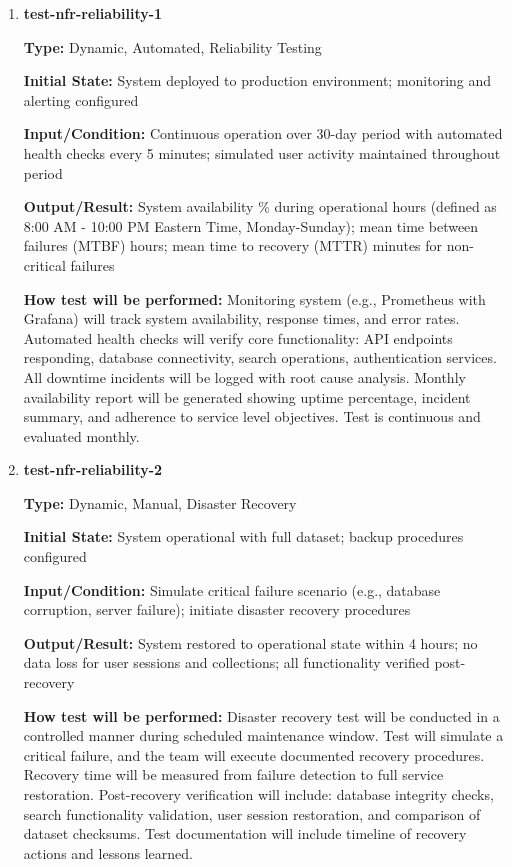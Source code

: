 \documentclass[12pt, titlepage]{article}
\begin{document}
\begin{enumerate}

\item \textbf{test-nfr-reliability-1}

\textbf{Type:} Dynamic, Automated, Reliability Testing
					
\textbf{Initial State:} System deployed to production environment; monitoring and alerting configured
					
\textbf{Input/Condition:} Continuous operation over 30-day period with automated health checks every 5 minutes; simulated user activity maintained throughout period
					
\textbf{Output/Result:} System availability \% during operational hours (defined as 8:00 AM - 10:00 PM Eastern Time, Monday-Sunday); mean time between failures (MTBF)  hours; mean time to recovery (MTTR)  minutes for non-critical failures
					
\textbf{How test will be performed:} Monitoring system (e.g., Prometheus with Grafana) will track system availability, response times, and error rates. Automated health checks will verify core functionality: API endpoints responding, database connectivity, search operations, authentication services. All downtime incidents will be logged with root cause analysis. Monthly availability report will be generated showing uptime percentage, incident summary, and adherence to service level objectives. Test is continuous and evaluated monthly.

\item \textbf{test-nfr-reliability-2}

\textbf{Type:} Dynamic, Manual, Disaster Recovery
					
\textbf{Initial State:} System operational with full dataset; backup procedures configured
					
\textbf{Input/Condition:} Simulate critical failure scenario (e.g., database corruption, server failure); initiate disaster recovery procedures
					
\textbf{Output/Result:} System restored to operational state within 4 hours; no data loss for user sessions and collections; all functionality verified post-recovery
					
\textbf{How test will be performed:} Disaster recovery test will be conducted in a controlled manner during scheduled maintenance window. Test will simulate a critical failure, and the team will execute documented recovery procedures. Recovery time will be measured from failure detection to full service restoration. Post-recovery verification will include: database integrity checks, search functionality validation, user session restoration, and comparison of dataset checksums. Test documentation will include timeline of recovery actions and lessons learned.

\end{enumerate}
\end{document}
